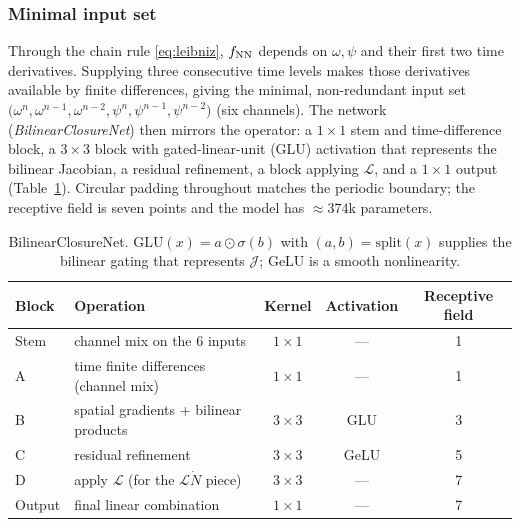 \documentclass[11pt]{article}
\theoremstyle{plain}
\theoremstyle{definition}
\newcommand{\Lop}{\mathcal{L}}
\newcommand{\Jop}{\mathcal{J}}
\newcommand{\Ndot}{\dot{N}}
\begin{document}
\subsubsection{Minimal input set}
Through the chain rule \eqref{eq:leibniz}, $f_{\rm NN}$ depends on $\omega,\psi$
and their first two time derivatives. Supplying three consecutive time levels
makes those derivatives available by finite differences, giving the minimal,
non-redundant input set
$\big(\omega^n,\omega^{n-1},\omega^{n-2},\psi^n,\psi^{n-1},\psi^{n-2}\big)$
(six channels). The network (\emph{BilinearClosureNet}) then mirrors the
operator: a $1\times1$ stem and time-difference block, a $3\times3$ block with
gated-linear-unit (GLU) activation that represents the bilinear Jacobian, a
residual refinement, a block applying $\Lop$, and a $1\times1$ output
(Table~\ref{tab:arch}). Circular padding throughout matches the periodic
boundary; the receptive field is seven points and the model has
$\approx\!374$k parameters.
\begin{table}[h]
\centering\small
\caption{BilinearClosureNet. $\mathrm{GLU}(x)=a\odot\sigma(b)$ with
$(a,b)=\mathrm{split}(x)$ supplies the bilinear gating that represents $\Jop$;
$\mathrm{GeLU}$ is a smooth nonlinearity.}
\label{tab:arch}
\begin{tabular}{llccc}
\toprule
Block & Operation & Kernel & Activation & Receptive field \\
\midrule
Stem   & channel mix on the 6 inputs           & $1\times1$ & ---  & 1 \\
A      & time finite differences (channel mix) & $1\times1$ & ---  & 1 \\
B      & spatial gradients + bilinear products & $3\times3$ & GLU  & 3 \\
C      & residual refinement                   & $3\times3$ & GeLU & 5 \\
D      & apply $\Lop$ (for the $\Lop\Ndot$ piece)& $3\times3$& ---  & 7 \\
Output & final linear combination              & $1\times1$ & ---  & 7 \\
\bottomrule
\end{tabular}
\end{table}
\end{document}
